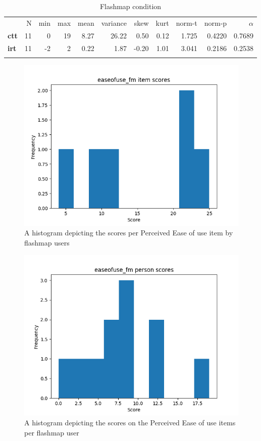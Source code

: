 \begin{longtable}[c]{@{}lrrrrrrrrrr@{}}
\caption{Flashmap condition}
\endfirsthead
\toprule\addlinespace
& N & min & max & mean & variance & skew & kurt & norm-t &
norm-p & $\alpha$
\\\addlinespace
\midrule
\textbf{ctt} & 11 & 0 & 19 & 8.27 & 26.22 & 0.50 & 0.12 & 1.725 & 0.4220
& 0.7689
\\\addlinespace
\textbf{irt} & 11 & -2 & 2 & 0.22 & 1.87 & -0.20 & 1.01 & 3.041 & 0.2186
& 0.2538
\\\addlinespace
\bottomrule
    \label{tab:easeofuse_fm}
\end{longtable}

\begin{figure}
    \includegraphics[width=\textwidth]{img/easeofuse_fm_diff.png}
    \caption{A histogram depicting the scores per Perceived Ease of use item by flashmap users}
    \label{fig:easeofuse_fm_diff}
\end{figure}
\begin{figure}
    \includegraphics[width=\textwidth]{img/easeofuse_fm_abil.png}
    \caption{A histogram depicting the scores on the Perceived Ease of use items per flashmap user}
    \label{fig:easeofuse_fm_abil}
\end{figure}

